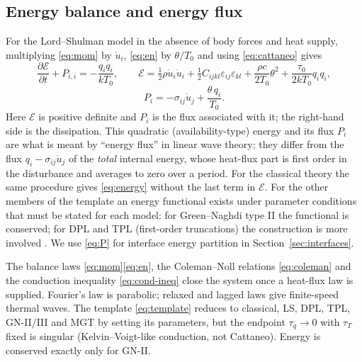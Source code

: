 \subsection{Energy balance and energy flux}\label{sec:energy}
For the Lord--Shulman model in the absence of body forces and heat supply, multiplying \eqref{eq:mom} by $\dot u_i$, \eqref{eq:en} by $\theta/T_0$ and using \eqref{eq:cattaneo} gives
\begin{equation}
\frac{\partial\mathcal E}{\partial t}+P_{i,i}=-\frac{q_iq_i}{kT_0},\qquad
\mathcal E=\tfrac12\rho\dot u_i\dot u_i+\tfrac12C_{ijkl}\varepsilon_{ij}\varepsilon_{kl}+\frac{\rho c}{2T_0}\theta^2+\frac{\tau_0}{2kT_0}q_iq_i,\label{eq:energy}
\end{equation}
\begin{equation}
P_i=-\sigma_{ij}\dot u_j+\frac{\theta\,q_i}{T_0}.\label{eq:P}
\end{equation}
Here $\mathcal E$ is positive definite and $P_i$ is the flux associated with it; the right-hand side is the dissipation. This quadratic (availability-type) energy and its flux $P_i$ are what is meant by ``energy flux'' in linear wave theory; they differ from the flux $q_i-\sigma_{ij}\dot u_j$ of the \emph{total} internal energy, whose heat-flux part is first order in the disturbance and averages to zero over a period. For the classical theory the same procedure gives \eqref{eq:energy} without the last term in $\mathcal E$. For the other members of the template an energy functional exists under parameter conditions that must be stated for each model: for Green--Naghdi type II the functional is conserved; for DPL and TPL (first-order truncations) the construction is more involved \citep{Quintanilla2003DPL,Chirita2016}. We use \eqref{eq:P} for interface energy partition in Section~\ref{sec:interfaces}.


\begin{summarybox}[Summary]
The balance laws \eqref{eq:mom}\textendash\eqref{eq:en}, the Coleman--Noll relations \eqref{eq:coleman} and the conduction inequality \eqref{eq:cond-ineq} close the system once a heat-flux law is supplied. Fourier's law is parabolic; relaxed and lagged laws give finite-speed thermal waves. The template \eqref{eq:template} reduces to classical, LS, DPL, TPL, GN-II/III and MGT by setting its parameters, but the endpoint $\tau_q\to0$ with $\tau_T$ fixed is singular (Kelvin--Voigt-like conduction, not Cattaneo). Energy is conserved exactly only for GN-II.
\end{summarybox}